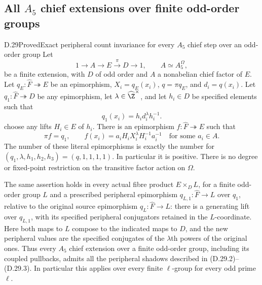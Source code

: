 \subsection{All \texorpdfstring{$A_5$}{A5} chief extensions over finite odd-order groups}

\begin{statement}{D.29}{Proved}{Exact peripheral count invariance for every $A_5$ chief step over an odd-order group}
Let
\[
 1\longrightarrow A\longrightarrow E\xrightarrow{\pi}D
 \longrightarrow1,
 \qquad A\simeq A_5^{\Omega},
 \tag{D.29.1}
\]
be a finite extension, with $D$ of odd order and $A$ a
nonabelian chief factor of $E$.  Let
$q_E:\widehat F\twoheadrightarrow E$ be an epimorphism,
$X_i=q_E(x_i)$, $q=\pi q_E$, and $d_i=q(x_i)$.
Let $q_1:\widehat F\twoheadrightarrow D$ be any
epimorphism, let $\lambda\in\widehat\Z^\times$, and
let $h_i\in D$ be specified elements such that
\[
           q_1(x_i)=h_i d_i^\lambda h_i^{-1}.
 \tag{D.29.2}
\]
choose any lifts $H_i\in E$ of $h_i$.
There is an epimorphism $f:\widehat F\twoheadrightarrow E$
such that
\[
 \pi f=q_1,
 \qquad
 f(x_i)=a_iH_iX_i^\lambda H_i^{-1}a_i^{-1}
              \quad\text{for some }a_i\in A.
 \tag{D.29.3}
\]
The number of these literal epimorphisms is exactly the
number for $(q_1,\lambda,h_1,h_2,h_3)=(q,1,1,1,1)$.
In particular it is positive.  There is no degree or
fixed-point restriction on the transitive factor action
on $\Omega$.

The same assertion holds in every actual fibre product
$E\times_D L$, for a finite odd-order group $L$ and a
prescribed peripheral epimorphism $q_{L,1}:\widehat F\to L$
over $q_1$, relative to the original source epimorphism
$q_L:\widehat F\to L$: there is a generating lift over
$q_{L,1}$, with its specified peripheral conjugators
retained in the $L$-coordinate.  Here both maps to $L$
compose to the indicated maps to $D$, and the new
peripheral values are the specified conjugates of the
$\lambda$th powers of the original ones.
Thus every $A_5$ chief extension over a
finite odd-order group, including its coupled pullbacks, admits
all the peripheral shadows described in
\textup{(D.29.2)--(D.29.3)}.
In particular this applies over every finite $\ell$-group
for every odd prime $\ell$.
\end{statement}

